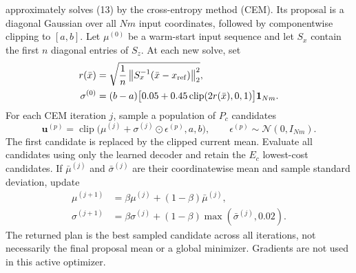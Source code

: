 \documentclass[11pt]{article}
\newcommand{\clip}{\operatorname{clip}}
\newcommand{\code}[1]{\texttt{\detokenize{#1}}}
\begin{document}
\code{DataDrivenCEMSolver} approximately solves (13) by the cross-entropy method (CEM). Its proposal is a diagonal Gaussian over all $Nm$ input coordinates, followed by componentwise clipping to $[a,b]$. Let $\mu^{(0)}$ be a warm-start input sequence and let $S_x$ contain the first $n$ diagonal entries of $S_z$. At each new solve, set
\begin{align}
r(\bar x)&=\sqrt{\frac1n\left\|S_x^{-1}(\bar x-x_{\rm ref})\right\|_2^2},\label{eq:radius}\\
\sigma^{(0)}&=(b-a)\bigl[0.05+0.45\clip(2r(\bar x),0,1)\bigr]\mathbf1_{Nm}.\label{eq:std}
\end{align}
For each CEM iteration $j$, sample a population of $P_c$ candidates
\begin{equation}\label{eq:candidates}
\mathbf u^{(p)}=\clip\bigl(\mu^{(j)}+\sigma^{(j)}\odot\epsilon^{(p)},a,b\bigr),\qquad
\epsilon^{(p)}\sim\mathcal N(0,I_{Nm}).
\end{equation}
The first candidate is replaced by the clipped current mean. Evaluate all candidates using only the learned decoder and retain the $E_c$ lowest-cost candidates. If $\bar\mu^{(j)}$ and $\bar\sigma^{(j)}$ are their coordinatewise mean and sample standard deviation, update
\begin{align}
\mu^{(j+1)}&=\beta\mu^{(j)}+(1-\beta)\bar\mu^{(j)},\label{eq:cemmean}\\
\sigma^{(j+1)}&=\beta\sigma^{(j)}+(1-\beta)\max(\bar\sigma^{(j)},0.02).\label{eq:cemstd}
\end{align}
The returned plan is the best sampled candidate across all iterations, not necessarily the final proposal mean or a global minimizer. Gradients are not used in this active optimizer.
\end{document}
